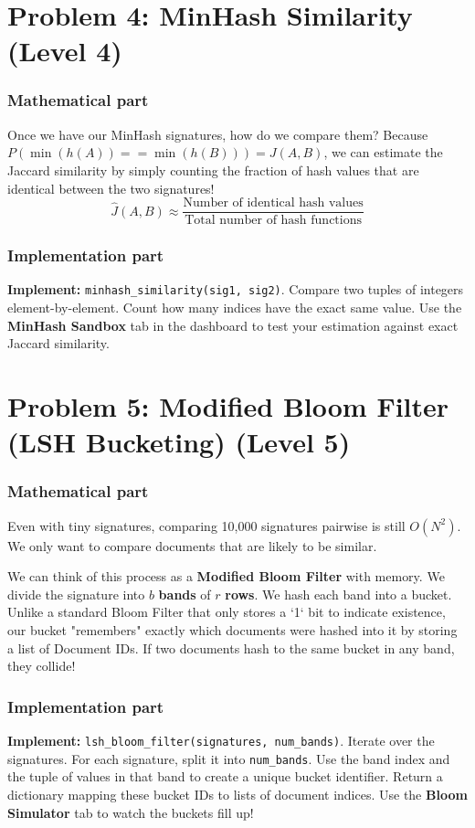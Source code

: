 \documentclass[11pt]{article}
\begin{document}
\section*{Problem 4: MinHash Similarity (Level 4)}

\subsubsection*{Mathematical part}
Once we have our MinHash signatures, how do we compare them? Because $P(\min(h(A)) == \min(h(B))) = J(A, B)$, we can estimate the Jaccard similarity by simply counting the fraction of hash values that are identical between the two signatures!
$$ \hat{J}(A, B) \approx \frac{\text{Number of identical hash values}}{\text{Total number of hash functions}} $$

\subsubsection*{Implementation part}
\textbf{Implement:} \lstinline|minhash_similarity(sig1, sig2)|.
Compare two tuples of integers element-by-element. Count how many indices have the exact same value. Use the \textbf{MinHash Sandbox} tab in the dashboard to test your estimation against exact Jaccard similarity.


\section*{Problem 5: Modified Bloom Filter (LSH Bucketing) (Level 5)}

\subsubsection*{Mathematical part}
Even with tiny signatures, comparing 10,000 signatures pairwise is still $O(N^2)$. We only want to compare documents that are likely to be similar. 

We can think of this process as a \textbf{Modified Bloom Filter} with memory. We divide the signature into $b$ \textbf{bands} of $r$ \textbf{rows}. We hash each band into a bucket. Unlike a standard Bloom Filter that only stores a `1` bit to indicate existence, our bucket "remembers" exactly which documents were hashed into it by storing a list of Document IDs. If two documents hash to the same bucket in any band, they collide!

\subsubsection*{Implementation part}
\textbf{Implement:} \lstinline|lsh_bloom_filter(signatures, num_bands)|.
Iterate over the signatures. For each signature, split it into \lstinline|num_bands|. Use the band index and the tuple of values in that band to create a unique bucket identifier. Return a dictionary mapping these bucket IDs to lists of document indices. Use the \textbf{Bloom Simulator} tab to watch the buckets fill up!
\end{document}
